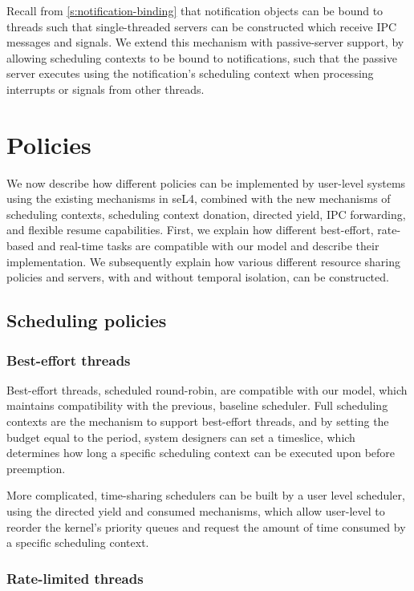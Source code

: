 Recall from \cref{s:notification-binding} that notification objects can be bound to threads such that single-threaded servers can be 
constructed which receive \gls{IPC} messages and signals. We extend this mechanism with passive-server
support, by allowing scheduling contexts to be bound to notifications, such that the passive server
executes using the notification's scheduling context when processing interrupts or signals from other
threads. 

\section{Policies}
\label{sec:model-policies}

We now describe how different policies can be implemented by user-level systems using the 
existing mechanisms in seL4, combined with the new mechanisms of scheduling contexts,
scheduling context donation, directed yield, \gls{IPC} forwarding, and flexible resume capabilities.
First, we explain how different best-effort, rate-based and real-time tasks are compatible
with our model and describe their implementation. We subsequently explain how various different 
resource sharing policies and servers, with and without temporal isolation, can be constructed. 

\subsection{Scheduling policies}

\subsubsection{Best-effort threads}

Best-effort threads, scheduled round-robin, are compatible with our model, which maintains
compatibility with the previous, baseline \selfour scheduler.  Full scheduling contexts are the
mechanism to support best-effort threads, and by setting the budget equal to the period, system
designers can set a timeslice, which determines how long a specific scheduling context can be
executed upon before preemption.

More complicated, time-sharing schedulers can be built by a user level scheduler, using the directed
yield and consumed mechanisms, which allow user-level to reorder the kernel's priority queues and
request the amount of time consumed by a specific scheduling context.

\subsubsection{Rate-limited threads}

